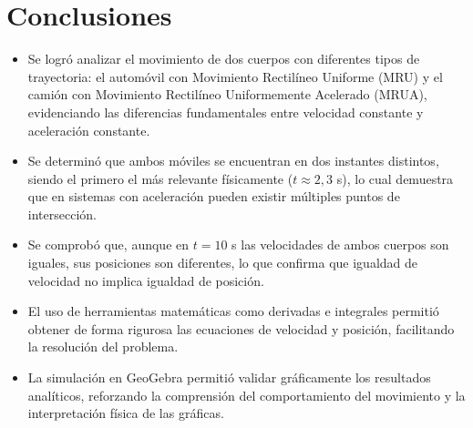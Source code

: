 \section{Conclusiones}

\begin{itemize}
    \item Se logró analizar el movimiento de dos cuerpos con diferentes tipos de trayectoria: el automóvil con Movimiento Rectilíneo Uniforme (MRU) y el camión con Movimiento Rectilíneo Uniformemente Acelerado (MRUA), evidenciando las diferencias fundamentales entre velocidad constante y aceleración constante.
    
    \item Se determinó que ambos móviles se encuentran en dos instantes distintos, siendo el primero el más relevante físicamente ($t \approx 2{,}3$ s), lo cual demuestra que en sistemas con aceleración pueden existir múltiples puntos de intersección.
    
    \item Se comprobó que, aunque en $t = 10$ s las velocidades de ambos cuerpos son iguales, sus posiciones son diferentes, lo que confirma que igualdad de velocidad no implica igualdad de posición.
    
    \item El uso de herramientas matemáticas como derivadas e integrales permitió obtener de forma rigurosa las ecuaciones de velocidad y posición, facilitando la resolución del problema.
    
    \item La simulación en GeoGebra permitió validar gráficamente los resultados analíticos, reforzando la comprensión del comportamiento del movimiento y la interpretación física de las gráficas.
\end{itemize}